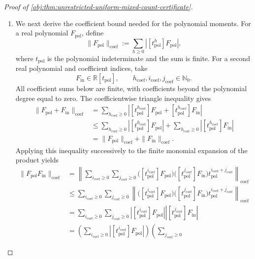 \begin{proof}[Proof of \cref{obj:thm:unrestricted-uniform-mixed-count-certificate}]
\begin{enumerate}
\item We next derive the coefficient bound needed for the polynomial
moments. For a real polynomial \(F_{\mathrm{pol}}\), define
\[
\|F_{\mathrm{pol}}\|_{\mathrm{coef}}
:=\sum_{h\ge0}|[t_{\mathrm{pol}}^h]F_{\mathrm{pol}}|,
\]
where \(t_{\mathrm{pol}}\) is the polynomial indeterminate and the sum is
finite. For a second real polynomial and coefficient indices, take
\[
F_{\mathrm{in}}\in\mathbb R[t_{\mathrm{pol}}],
\qquad
h_{\mathrm{coef}},i_{\mathrm{coef}},j_{\mathrm{coef}}\in\mathbb N_0.
\]
All coefficient sums below are finite, with coefficients beyond the
polynomial degree equal to zero. The coefficientwise triangle inequality
 gives
\[
\begin{aligned}
\|F_{\mathrm{pol}}+F_{\mathrm{in}}\|_{\mathrm{coef}}
&=\sum_{h_{\mathrm{coef}}\ge0}
\left|[t_{\mathrm{pol}}^{h_{\mathrm{coef}}}]F_{\mathrm{pol}}
+[t_{\mathrm{pol}}^{h_{\mathrm{coef}}}]F_{\mathrm{in}}\right|\\
&\le\sum_{h_{\mathrm{coef}}\ge0}
\left|[t_{\mathrm{pol}}^{h_{\mathrm{coef}}}]F_{\mathrm{pol}}\right|
+\sum_{h_{\mathrm{coef}}\ge0}
\left|[t_{\mathrm{pol}}^{h_{\mathrm{coef}}}]F_{\mathrm{in}}\right|\\
&=\|F_{\mathrm{pol}}\|_{\mathrm{coef}}
+\|F_{\mathrm{in}}\|_{\mathrm{coef}}.
\end{aligned}
\]
Applying this inequality successively to the finite monomial expansion
of the product yields
\[
\begin{aligned}
\|F_{\mathrm{pol}}F_{\mathrm{in}}\|_{\mathrm{coef}}
&=\left\|
\sum_{i_{\mathrm{coef}}\ge0}\sum_{j_{\mathrm{coef}}\ge0}
\bigl([t_{\mathrm{pol}}^{i_{\mathrm{coef}}}]F_{\mathrm{pol}}\bigr)
\bigl([t_{\mathrm{pol}}^{j_{\mathrm{coef}}}]F_{\mathrm{in}}\bigr)
 t_{\mathrm{pol}}^{i_{\mathrm{coef}}+j_{\mathrm{coef}}}
\right\|_{\mathrm{coef}}\\
&\le\sum_{i_{\mathrm{coef}}\ge0}\sum_{j_{\mathrm{coef}}\ge0}
\left\|
\bigl([t_{\mathrm{pol}}^{i_{\mathrm{coef}}}]F_{\mathrm{pol}}\bigr)
\bigl([t_{\mathrm{pol}}^{j_{\mathrm{coef}}}]F_{\mathrm{in}}\bigr)
 t_{\mathrm{pol}}^{i_{\mathrm{coef}}+j_{\mathrm{coef}}}
\right\|_{\mathrm{coef}}\\
&=\sum_{i_{\mathrm{coef}}\ge0}\sum_{j_{\mathrm{coef}}\ge0}
\left|[t_{\mathrm{pol}}^{i_{\mathrm{coef}}}]F_{\mathrm{pol}}\right|
\left|[t_{\mathrm{pol}}^{j_{\mathrm{coef}}}]F_{\mathrm{in}}\right|\\
&=\left(\sum_{i_{\mathrm{coef}}\ge0}
\left|[t_{\mathrm{pol}}^{i_{\mathrm{coef}}}]F_{\mathrm{pol}}\right|\right)
\left(\sum_{j_{\mathrm{coef}}\ge0}

\end{aligned}\]
\end{enumerate}
\end{proof}
